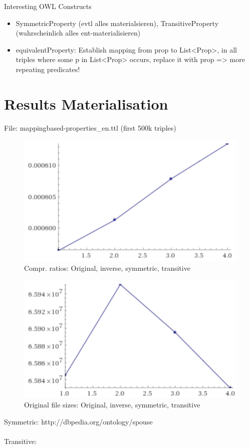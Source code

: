 \documentclass[a4paper]{scrartcl}
\begin{document}
Interesting OWL Constructs
\begin{itemize}
	\item SymmetricProperty (evtl alles materialsieren), TransitiveProperty (wahrscheinlich alles ent-materialisieren)
	\item equivalentProperty: Establish mapping from prop to List<Prop>, in all triples where some p in List<Prop> occurs, replace it with prop => more repeating predicates!
\end{itemize}

\section{Results Materialisation}
 File: mappingbased-properties\_en.ttl (first 500k triples)
 
 
\begin{figure}
	\centering
	\includegraphics[width=0.7\linewidth]{img/evalMat/ratios}
	\caption{Compr. ratios: Original, inverse, symmetric, transitive}
	\label{fig:ratios}
\end{figure}

\begin{figure}
	\centering
	\includegraphics[width=0.7\linewidth]{img/evalMat/sizes}
	\caption{Original file sizes: Original, inverse, symmetric, transitive}
	\label{fig:sizes}
\end{figure}

Symmetric: http://dbpedia.org/ontology/spouse
\\\\
Transitive:
\end{document}
